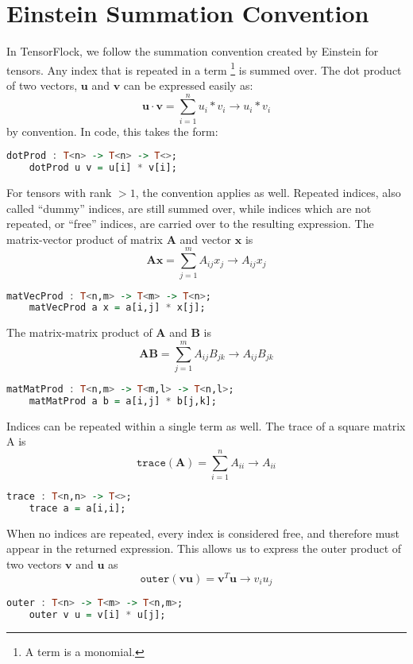 \section{Einstein Summation Convention}%
\label{sec:einstein_summation_convention}

In TensorFlock, we follow the summation convention created by Einstein for
tensors. Any index that is repeated in a term \footnote{A term is a monomial.}  
is summed over. The dot product of two vectors, $\mathbf{u}$ and $\mathbf{v}$
can be expressed easily as: 
\[\mathbf{u} \cdot \mathbf{v} = \sum^{n}_{i=1} u_i * v_i \rightarrow u_i * v_i\] by
convention. In code, this takes the form:
\begin{lstlisting}[language=haskell]
    dotProd : T<n> -> T<n> -> T<>;
    dotProd u v = u[i] * v[i];
\end{lstlisting}

For tensors with rank $> 1$, the convention applies as well. Repeated indices,
also called ``dummy'' indices, are still summed over, while indices which are
not repeated, or ``free'' indices, are carried over to the resulting
expression. The matrix-vector product of matrix $\mathbf{A}$ and vector
$\mathbf{x}$ is  
\[ \mathbf{A} \mathbf{x} = \sum^{m}_{j=1} A_{ij} x_j \rightarrow A_{ij} x_j \]
\begin{lstlisting}[language=haskell]
    matVecProd : T<n,m> -> T<m> -> T<n>;
    matVecProd a x = a[i,j] * x[j];
\end{lstlisting}

The matrix-matrix product of $ \mathbf{A} $ and $ \mathbf{B} $ is 
\[ \mathbf{A} \mathbf{B} = \sum^{m}_{j=1} A_{ij} B_{jk} 
   \rightarrow A_{ij} B_{jk} \]
\begin{lstlisting}[language=haskell]
    matMatProd : T<n,m> -> T<m,l> -> T<n,l>;
    matMatProd a b = a[i,j] * b[j,k];
\end{lstlisting}

Indices can be repeated within a single term as well. The trace of a square
matrix A is \[ \texttt{trace}( \mathbf{A} ) = \sum^{n}_{i=1} A_{ii} \rightarrow A_{ii}\] 
\begin{lstlisting}[language=haskell]
    trace : T<n,n> -> T<>;
    trace a = a[i,i];
\end{lstlisting}

When no indices are repeated, every index is considered free, and therefore
must appear in the returned expression. This allows us to express the outer
product of two vectors $ \mathbf{v} $ and $ \mathbf{u} $ as 
\[ \texttt{outer} (\mathbf{v} \mathbf{u}) = \mathbf{v}^T \mathbf{u} \rightarrow  v_i u_j\]
\begin{lstlisting}[language=haskell]
    outer : T<n> -> T<m> -> T<n,m>;
    outer v u = v[i] * u[j];
\end{lstlisting}

